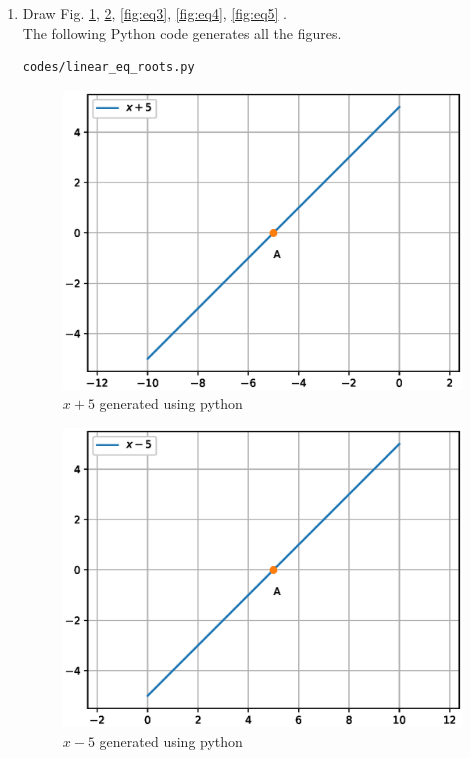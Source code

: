 \renewcommand{\theequation}{\theenumi}
\begin{enumerate}[label=\thesection.\arabic*.,ref=\thesection.\theenumi]

\item Draw Fig. \ref{fig:eq1}, \ref{fig:eq2}, \ref{fig:eq3}, \ref{fig:eq4}, \ref{fig:eq5} .\\

\solution The  following Python code generates all the figures.
\begin{lstlisting}
codes/linear_eq_roots.py
\end{lstlisting}

\begin{figure}[h!]
\centering
\includegraphics[width=\columnwidth]{./figs/eq1.eps}
\caption{$x + 5$ generated using python}
\label{fig:eq1}
\end{figure} 

\begin{figure}[h!]
\centering
\includegraphics[width=\columnwidth]{./figs/eq2.eps}
\caption{$x - 5$ generated using python}
\label{fig:eq2}
\end{figure} 


\end{enumerate}
